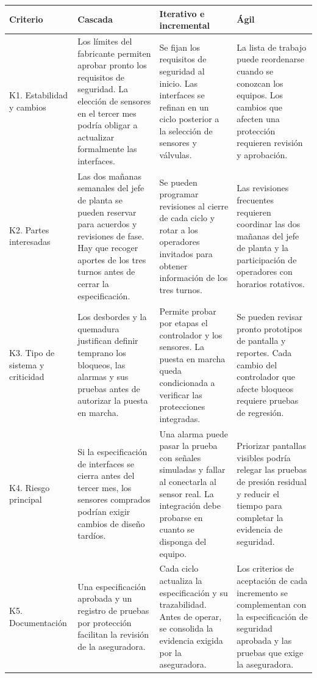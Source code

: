 \documentclass[11pt,a4paper]{article}
\begin{document}
\begingroup
\small
\setlength{\tabcolsep}{4pt}
\begin{xltabular}{\textwidth}{|p{0.17\textwidth}|X|X|X|}
\hline
{}
\textbf{Criterio} & \textbf{Cascada} &
\textbf{Iterativo e incremental} & \textbf{Ágil} \\ \hline
\endhead

K1. Estabilidad y cambios &
Los límites del fabricante permiten aprobar pronto los requisitos de seguridad. La elección de sensores en el tercer mes podría obligar a actualizar formalmente las interfaces. &
Se fijan los requisitos de seguridad al inicio. Las interfaces se refinan en un ciclo posterior a la selección de sensores y válvulas. &
La lista de trabajo puede reordenarse cuando se conozcan los equipos. Los cambios que afecten una protección requieren revisión y aprobación.
\\ \hline

K2. Partes interesadas &
Las dos mañanas semanales del jefe de planta se pueden reservar para acuerdos y revisiones de fase. Hay que recoger aportes de los tres turnos antes de cerrar la especificación. &
Se pueden programar revisiones al cierre de cada ciclo y rotar a los operadores invitados para obtener información de los tres turnos. &
Las revisiones frecuentes requieren coordinar las dos mañanas del jefe de planta y la participación de operadores con horarios rotativos.
\\ \hline

K3. Tipo de sistema y criticidad &
Los desbordes y la quemadura justifican definir temprano los bloqueos, las alarmas y sus pruebas antes de autorizar la puesta en marcha. &
Permite probar por etapas el controlador y los sensores. La puesta en marcha queda condicionada a verificar las protecciones integradas. &
Se pueden revisar pronto prototipos de pantalla y reportes. Cada cambio del controlador que afecte bloqueos requiere pruebas de regresión.
\\ \hline

K4. Riesgo principal &
Si la especificación de interfaces se cierra antes del tercer mes, los sensores comprados podrían exigir cambios de diseño tardíos. &
Una alarma puede pasar la prueba con señales simuladas y fallar al conectarla al sensor real. La integración debe probarse en cuanto se disponga del equipo. &
Priorizar pantallas visibles podría relegar las pruebas de presión residual y reducir el tiempo para completar la evidencia de seguridad.
\\ \hline

K5. Documentación &
Una especificación aprobada y un registro de pruebas por protección facilitan la revisión de la aseguradora. &
Cada ciclo actualiza la especificación y su trazabilidad. Antes de operar, se consolida la evidencia exigida por la aseguradora. &
Los criterios de aceptación de cada incremento se complementan con la especificación de seguridad aprobada y las pruebas que exige la aseguradora.
\\ \hline
\end{xltabular}
\endgroup
\end{document}
